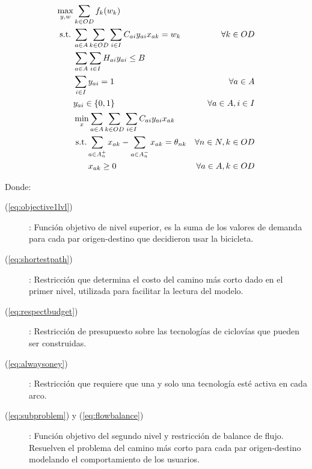 \begin{align}
  \max_{y,w}       & \sum_{k \in OD} f_k(w_k)                                                       & \label{eq:objective1lvl} \\
  \text{s.t.}\;  & \sum_{a \in A} \sum_{k \in OD} \sum_{i \in I} C_{ai}y_{ai}x_{ak} = w_k           & \forall k \in OD \label{eq:shortestpath} \\
                 & \sum_{a \in A} \sum_{i \in I} H_{ai}y_{ai} \leq B                                & \label{eq:respectbudget} \\
                 & \sum_{i \in I} y_{ai} = 1                                                        & \forall a \in A \label{eq:alwaysoney} \\
                 & y_{ai} \in \{0,1\}                                                               & \forall a \in A, i \in I \nonumber \\
                 & \min_{x} \sum_{a \in A} \sum_{k \in OD} \sum_{i \in I} C_{ai}y_{ai}x_{ak}        & \label{eq:subproblem} \\
                 & \;\text{s.t.} \sum_{a \in A_n^+} x_{ak} - \sum_{a \in A_n^-} x_{ak} = \theta_{nk}  & \forall n \in N, k \in OD \label{eq:flowbalance} \\
                 & \;\hspace{1.5em} x_{ak} \geq 0                                                        & \forall a \in A, k \in OD \nonumber
\end{align}

Donde:

\begin{description}
  \item[(\ref{eq:objective1lvl})]: Función objetivo de nivel superior, es la suma de los valores de demanda para cada par origen-destino que decidieron usar la bicicleta.
  \item[(\ref{eq:shortestpath})]: Restricción que determina el costo del camino más corto dado en el primer nivel, utilizada para facilitar la lectura del modelo.
  \item[(\ref{eq:respectbudget})]: Restricción de presupuesto sobre las tecnologías de ciclovías que pueden ser construidas.
  \item[(\ref{eq:alwaysoney})]: Restricción que requiere que una y solo una tecnología esté activa en cada arco.
  \item[(\ref{eq:subproblem}) y (\ref{eq:flowbalance})]: Función objetivo del segundo nivel y restricción de balance de flujo. Resuelven el problema del camino más corto para cada par origen-destino modelando el comportamiento de los usuarios.
\end{description}

